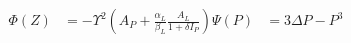 \begin{equation*}
\begin{array}{lll}
  \Phi(Z) & =  - \varUpsilon^{2} \left(A_{P} + \frac{\alpha_{L}}{\beta_{L}}\frac{A_{L}}{1+ \delta I_{P}}\right)
  \Psi(P) & =  3 \Delta P - P^{3}
\end{array}  
\end{equation*}
